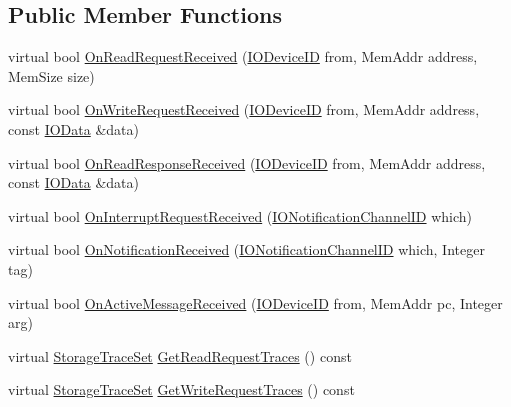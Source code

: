 \subsection*{Public Member Functions}
\begin{DoxyCompactItemize}
\item 
virtual bool \hyperlink{class_simulator_1_1_i_i_o_bus_client_afeb9155b104d868e9e6c2a3366a39b3e}{On\+Read\+Request\+Received} (\hyperlink{namespace_simulator_a3493d987c866ad6b8aaa704c42502db0}{I\+O\+Device\+I\+D} from, Mem\+Addr address, Mem\+Size size)
\item 
virtual bool \hyperlink{class_simulator_1_1_i_i_o_bus_client_a69d1908e4e0fb82c86834ed570a7d6c9}{On\+Write\+Request\+Received} (\hyperlink{namespace_simulator_a3493d987c866ad6b8aaa704c42502db0}{I\+O\+Device\+I\+D} from, Mem\+Addr address, const \hyperlink{struct_simulator_1_1_i_o_data}{I\+O\+Data} \&data)
\item 
virtual bool \hyperlink{class_simulator_1_1_i_i_o_bus_client_aabdb58549281acb31be5b3f4509bb614}{On\+Read\+Response\+Received} (\hyperlink{namespace_simulator_a3493d987c866ad6b8aaa704c42502db0}{I\+O\+Device\+I\+D} from, Mem\+Addr address, const \hyperlink{struct_simulator_1_1_i_o_data}{I\+O\+Data} \&data)
\item 
virtual bool \hyperlink{class_simulator_1_1_i_i_o_bus_client_a0db0fd1d1e39692b620e00078d98694a}{On\+Interrupt\+Request\+Received} (\hyperlink{namespace_simulator_a951e1bf3ee91c11c980382a7bcbba287}{I\+O\+Notification\+Channel\+I\+D} which)
\item 
virtual bool \hyperlink{class_simulator_1_1_i_i_o_bus_client_a644849b2eeba15404c990d1942a311e5}{On\+Notification\+Received} (\hyperlink{namespace_simulator_a951e1bf3ee91c11c980382a7bcbba287}{I\+O\+Notification\+Channel\+I\+D} which, Integer tag)
\item 
virtual bool \hyperlink{class_simulator_1_1_i_i_o_bus_client_aade76dc1252a795578c82e05a47fdf66}{On\+Active\+Message\+Received} (\hyperlink{namespace_simulator_a3493d987c866ad6b8aaa704c42502db0}{I\+O\+Device\+I\+D} from, Mem\+Addr pc, Integer arg)
\item 
virtual \hyperlink{class_simulator_1_1_storage_trace_set}{Storage\+Trace\+Set} \hyperlink{class_simulator_1_1_i_i_o_bus_client_a072812e7f032284934a9a302276b6f50}{Get\+Read\+Request\+Traces} () const 
\item 
virtual \hyperlink{class_simulator_1_1_storage_trace_set}{Storage\+Trace\+Set} \hyperlink{class_simulator_1_1_i_i_o_bus_client_a196ff28850f3cbefef216b4df9eb2116}{Get\+Write\+Request\+Traces} () const 

\end{DoxyCompactItemize}
